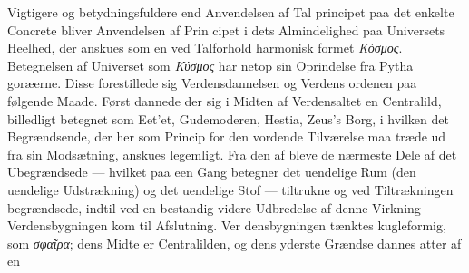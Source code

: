 \documentclass[12pt,a4paper]{book}
\newcommand{\gk}[1]{\textit{#1}}
\begin{document}
Vigtigere og betydningsfuldere end Anvendelsen af Tal\-%
principet paa det enkelte Concrete bliver Anvendelsen af Prin\-%
cipet i dets Almindelighed paa Universets Heelhed, der anskues
som en ved Talforhold harmonisk formet \gk{Κόσμος}. Betegnelsen
af Universet som \gk{Κύσμος} har netop sin Oprindelse fra Pytha\-%
goræerne. Disse forestillede sig Verdensdannelsen og Verdens\-%
ordenen paa følgende Maade. Først dannede der sig i Midten
af Verdensaltet en Centralild, billedligt betegnet som Eet'et,
Gudemoderen, Hestia, Zeus's Borg, i hvilken det Begrændsende,
der her som Princip for den vordende Tilværelse maa træde
ud fra sin Modsætning, anskues legemligt. Fra den af bleve
de nærmeste Dele af det Ubegrændsede --- hvilket paa een
Gang betegner det uendelige Rum (den uendelige Udstrækning)
og det uendelige Stof --- tiltrukne og ved Tiltrækningen
begrændsede, indtil ved en bestandig videre Udbredelse af
denne Virkning Verdensbygningen kom til Afslutning. Ver\-%
densbygningen tænktes kugleformig, som \gk{σφαῖρα}; dens Midte
er Centralilden, og dens yderste Grændse dannes atter af en
\end{document}
